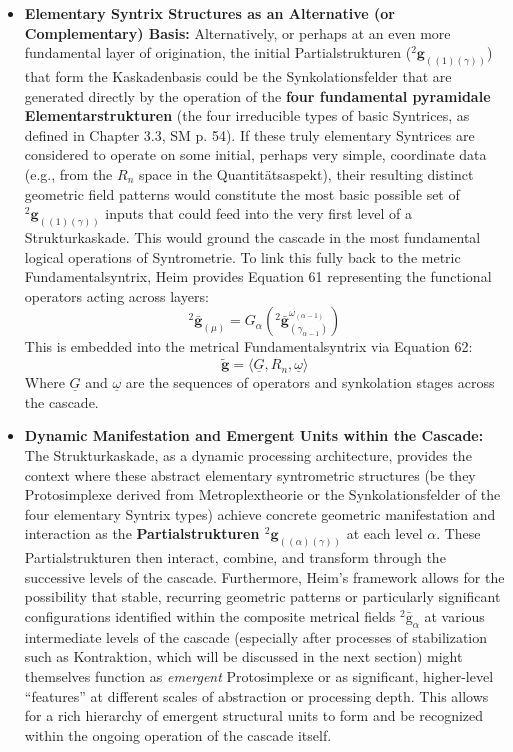 \documentclass[12pt]{article}
\newcommand{\q}[1]{\enquote{#1}}
\newcommand{\semantischermetrophor}{R_n}
\newcommand{\kompositionsfeld}{{}^2\bar{\mathrm{g}}}
\newcommand{\partialstruktur}[1]{{}^2\mathbf{g}_{(#1)}}
\newcommand{\kaskadenstufe}{\alpha}
\begin{document}
\begin{itemize}
    \item \textbf{Elementary Syntrix Structures as an Alternative (or Complementary) Basis:}
    Alternatively, or perhaps at an even more fundamental layer of origination, the initial Partialstrukturen (\(\partialstruktur{(1)(\gamma)}\)) that form the Kaskadenbasis could be the Synkolationsfelder that are generated directly by the operation of the \textbf{four fundamental pyramidale Elementarstrukturen} (the four irreducible types of basic Syntrices, as defined in Chapter 3.3, SM p. 54). If these truly elementary Syntrices are considered to operate on some initial, perhaps very simple, coordinate data (e.g., from the \( \semantischermetrophor \) space in the Quantitätsaspekt), their resulting distinct geometric field patterns would constitute the most basic possible set of \( \partialstruktur{(1)(\gamma)} \) inputs that could feed into the very first level of a Strukturkaskade. This would ground the cascade in the most fundamental logical operations of Syntrometrie. To link this fully back to the metric Fundamentalsyntrix, Heim provides Equation 61 representing the functional operators acting across layers:
    \begin{equation}
    {}^2\bar{\mathbf{g}}_{(\mu)} = G_\alpha({}^2\bar{\mathbf{g}}_{(\gamma_{\alpha-1})}^{\omega_{(\alpha-1)}})
    \label{eq:original_operator_G_alpha}
    \end{equation}
    This is embedded into the metrical Fundamentalsyntrix via Equation 62:
    \begin{equation}
    \tilde{\mathbf{g}} = \langle \underline{G}, R_n, \underline{\omega} \rangle
    \label{eq:original_metrical_fundamentalsyntrix}
    \end{equation}
    Where $\underline{G}$ and $\underline{\omega}$ are the sequences of operators and synkolation stages across the cascade.

    \item \textbf{Dynamic Manifestation and Emergent Units within the Cascade:}
    The Strukturkaskade, as a dynamic processing architecture, provides the context where these abstract elementary syntrometric structures (be they Protosimplexe derived from Metroplextheorie or the Synkolationsfelder of the four elementary Syntrix types) achieve concrete geometric manifestation and interaction as the \textbf{Partialstrukturen \( \partialstruktur{(\alpha)(\gamma)} \)} at each level \( \kaskadenstufe \). These Partialstrukturen then interact, combine, and transform through the successive levels of the cascade. Furthermore, Heim's framework allows for the possibility that stable, recurring geometric patterns or particularly significant configurations identified within the composite metrical fields \( \kompositionsfeld_\alpha \) at various intermediate levels of the cascade (especially after processes of stabilization such as Kontraktion, which will be discussed in the next section) might themselves function as \textit{emergent} Protosimplexe or as significant, higher-level \q{features} at different scales of abstraction or processing depth. This allows for a rich hierarchy of emergent structural units to form and be recognized within the ongoing operation of the cascade itself.


\end{itemize}
\end{document}
